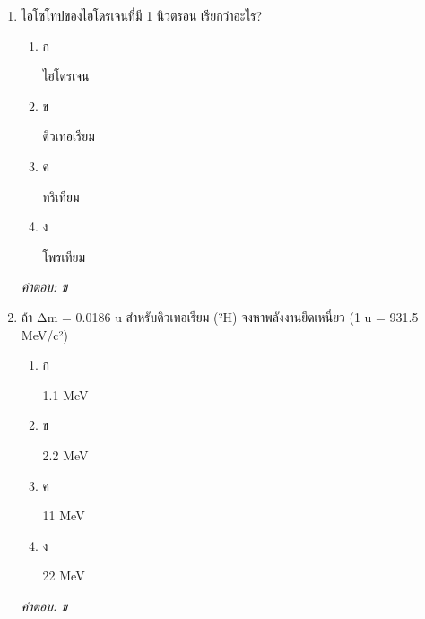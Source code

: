 \documentclass[12pt]{article}
\begin{document}
\begin{enumerate}[label=\arabic*., itemsep=0.5\baselineskip, topsep=0.5\baselineskip, leftmargin=*]
\item ไอโซโทปของไฮโดรเจนที่มี 1 นิวตรอน เรียกว่าอะไร?
\begin{enumerate}[label=\alph*)., itemsep=0.3\baselineskip, topsep=0.3\baselineskip]
\item ก\ 
\begin{minipage}[t]{0.9\linewidth}
\raggedright ไฮโดรเจน
\end{minipage}
\item ข\ 
\begin{minipage}[t]{0.9\linewidth}
\raggedright ดิวเทอเรียม
\end{minipage}
\item ค\ 
\begin{minipage}[t]{0.9\linewidth}
\raggedright ทริเทียม
\end{minipage}
\item ง\ 
\begin{minipage}[t]{0.9\linewidth}
\raggedright โพรเทียม
\end{minipage}
\end{enumerate}
\vspace{-0.3\baselineskip}
\begin{small}
\textit{คำตอบ: ข}
\end{small}

\item ถ้า Δm = 0.0186 u สำหรับดิวเทอเรียม (²H) จงหาพลังงานยึดเหนี่ยว (1 u = 931.5 MeV/c²)
\begin{enumerate}[label=\alph*)., itemsep=0.3\baselineskip, topsep=0.3\baselineskip]
\item ก\ 
\begin{minipage}[t]{0.9\linewidth}
\raggedright 1.1 MeV
\end{minipage}
\item ข\ 
\begin{minipage}[t]{0.9\linewidth}
\raggedright 2.2 MeV
\end{minipage}
\item ค\ 
\begin{minipage}[t]{0.9\linewidth}
\raggedright 11 MeV
\end{minipage}
\item ง\ 
\begin{minipage}[t]{0.9\linewidth}
\raggedright 22 MeV
\end{minipage}
\end{enumerate}
\vspace{-0.3\baselineskip}
\begin{small}
\textit{คำตอบ: ข}
\end{small}


\end{enumerate}
\end{document}
